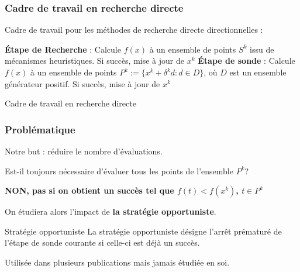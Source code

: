\documentclass{beamer}
\begin{document}
\begin{frame}
\frametitle{Cadre de travail en recherche directe}
Cadre de travail pour les méthodes de recherche directe directionnelles : 
\begin{algorithm}[H]
\begin{algorithmic}[]
	\STATE \textbf{Étape de Recherche} : Calcule $f(x)$ à un ensemble de points $S^k$ issu de mécanismes heuristiques.
	\STATE Si succès, mise à jour de $x^k$
	\STATE
	\STATE \textbf{Étape de sonde} : Calcule $f(x)$ à un ensemble de points 
	\STATE $P^k:=\{x^k+\delta ^k d:d\in D\}$, où $D$ est un ensemble générateur positif. 
	\STATE Si succès, mise à jour de $x^k$
	\ENDFOR
\end{algorithmic}
\caption{Cadre de travail en recherche directe}
\label{alg:seq}
\end{algorithm}
\end{frame}

\begin{frame}
\frametitle{Problématique}
Notre but : réduire le nombre d'évaluations.
\pause
\medskip

Est-il toujours nécessaire d'évaluer tous les points de l'ensemble $P^k$?
\pause
\medskip

\textbf{NON, pas si on obtient un succès tel que $f(t) < f(x^k)$, $t\in P^k$}
\pause
\medskip

On étudiera alors l'impact de \textbf{la stratégie opportuniste}.

\pause
{\begin{block}{Stratégie opportuniste}
La stratégie opportuniste désigne l'arrêt prématuré de l'étape de sonde courante si celle-ci est déjà un succès.
\end{block}}
\pause
\medskip

Utilisée dans plusieurs publications mais jamais étudiée en soi.
\end{frame}
\end{document}
